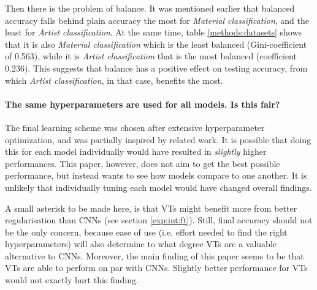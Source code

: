 Then there is the problem of balance. It was mentioned earlier that balanced accuracy falls behind plain accuracy the most for \textit{Material classification}, and the least for \textit{Artist classification}. At the same time, table \ref{methods:datasets} shows that it is also \textit{Material classification} which is the least balanced (Gini-coefficient of 0.563), while it is \textit{Artist classification} that is the most balanced (coefficient 0.236). This suggests that balance has a positive effect on testing accuracy, from which \textit{Artist classification}, in that case, benefits the most.


\paragraph{The same hyperparameters are used for all models. Is this fair?}
The final learning scheme was chosen after extensive hyperparameter optimization, and was partially inspired by related work. It is possible that doing this for each model individually would have resulted in \textit{slightly} higher performances. This paper, however, does not aim to get the best possible performance, but instead wants to see how models compare to one another. It is unlikely that individually tuning each model would have changed overall findings.

A small asterisk to be made here, is that VTs might benefit more from better regularisation than CNNs (see section \ref{exp:int:ft}). Still, final accuracy should not be the only concern, because ease of use (i.e. effort needed to find the right hyperparameters) will also determine to what degree VTs are a valuable alternative to CNNs. Moreover, the main finding of this paper seems to be that VTs are able to perform on par with CNNs. Slightly better performance for VTs would not exactly hurt this finding.

